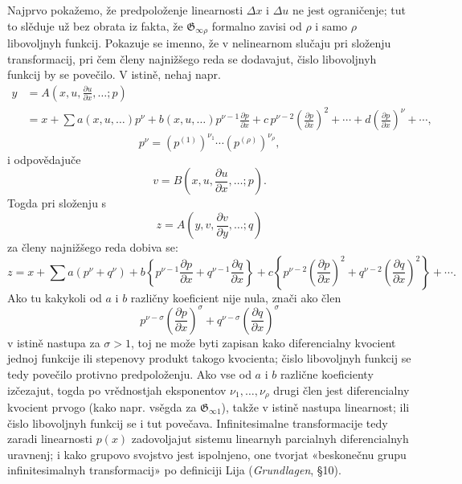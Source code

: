 \documentclass[11pt]{article}
\providecommand{\G}{\mathfrak G}
\providecommand{\D}{\Delta}
\providecommand{\p}{\partial}
\begin{document}
Najprvo pokažemo, že predpoloženje linearnosti \(\D x\) i \(\D u\) ne jest ograničenje; tut to slěduje už bez obrata iz fakta, že \(\G_{\infty\rho}\) formalno zavisi od \(\rho\) i samo \(\rho\) libovoljnyh funkcij. Pokazuje se imenno, že v nelinearnom slučaju pri složenju transformacij, pri čem členy najnižšego reda se dodavajut, čislo libovoljnyh funkcij by se povečilo. V istině, nehaj napr.
\[
\begin{aligned}
y&=A\!\left(x,u,\frac{\p u}{\p x},\ldots;p\right)\\
&=x+\sum a(x,u,\ldots)p^\nu
+b(x,u,\ldots)p^{\nu-1}\frac{\p p}{\p x}
+c\,p^{\nu-2}\left(\frac{\p p}{\p x}\right)^2+\cdots
+d\left(\frac{\p p}{\p x}\right)^\nu+\cdots,
\end{aligned}
\]
\[
p^\nu=(p^{(1)})^{\nu_1}\cdots(p^{(\rho)})^{\nu_\rho},
\]
i odpovědajuče
\[
v=B\!\left(x,u,\frac{\p u}{\p x},\ldots;p\right).
\]
Togda pri složenju s
\[
z=A\!\left(y,v,\frac{\p v}{\p y},\ldots;q\right)
\]
za členy najnižšego reda dobiva se:
\[
z=x+\sum a(p^\nu+q^\nu)+
b\left\{p^{\nu-1}\frac{\p p}{\p x}+q^{\nu-1}\frac{\p q}{\p x}\right\}
+c\left\{p^{\nu-2}\left(\frac{\p p}{\p x}\right)^2
+q^{\nu-2}\left(\frac{\p q}{\p x}\right)^2\right\}+\cdots.
\]
Ako tu kakykoli od \(a\) i \(b\) različny koeficient nije nula, znači ako člen
\[
p^{\nu-\sigma}\left(\frac{\p p}{\p x}\right)^\sigma
+q^{\nu-\sigma}\left(\frac{\p q}{\p x}\right)^\sigma
\]
v istině nastupa za \(\sigma>1\), toj ne može byti zapisan kako diferencialny kvocient jednoj funkcije ili stepenovy produkt takogo kvocienta; čislo libovoljnyh funkcij se tedy povečilo protivno predpoloženju. Ako vse od \(a\) i \(b\) različne koeficienty izčezajut, togda po vrědnostjah eksponentov \(\nu_1,\ldots,\nu_\rho\) drugi člen jest diferencialny kvocient prvogo (kako napr. vsěgda za \(\G_{\infty1}\)), takže v istině nastupa linearnost; ili čislo libovoljnyh funkcij se i tut povečava. Infinitesimalne transformacije tedy zaradi linearnosti \(p(x)\) zadovoljajut sistemu linearnyh parcialnyh diferencialnyh uravnenj; i kako grupovo svojstvo jest ispolnjeno, one tvorjat «beskonečnu grupu infinitesimalnyh transformacij» po definiciji Lija (\emph{Grundlagen}, \S{}10).
\end{document}
